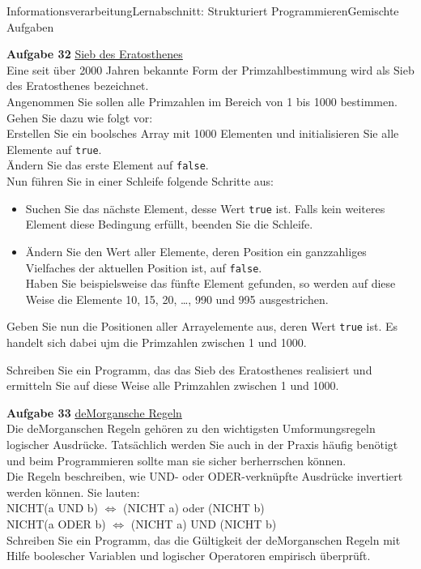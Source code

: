 \documentclass[oneside,openany,headings=optiontotoc,11pt,numbers=noenddot]{scrreprt}
\begin{document}
\begin{worksheet}{Informationsverarbeitung}{Lernabschnitt: Strukturiert Programmieren}{Gemischte Aufgaben}
\begin{framed}
			\par\noindent
			\textbf{Aufgabe 32} \underline{Sieb des Eratosthenes}\\
			Eine seit über 2000 Jahren bekannte Form der Primzahlbestimmung wird als \grqq{}Sieb des Eratosthenes\grqq{} bezeichnet.\\
			Angenommen Sie sollen alle Primzahlen im Bereich von 1 bis 1000 bestimmen. Gehen Sie dazu wie folgt vor:\\
			Erstellen Sie ein boolsches Array mit 1000 Elementen und initialisieren Sie alle Elemente auf \lstinline[style=JavaInputStyle]|true|.\\
			Ändern Sie das erste Element auf \lstinline[style=JavaInputStyle]|false|.\\
			Nun führen Sie in einer Schleife folgende Schritte aus:
			\begin{itemize}
				\item Suchen Sie das nächste Element, desse Wert \lstinline[style=JavaInputStyle]|true| ist. Falls kein weiteres Element diese Bedingung erfüllt, beenden Sie die Schleife.
				\item Ändern Sie den Wert aller Elemente, deren Position ein ganzzahliges Vielfaches der aktuellen Position ist, auf \lstinline[style=JavaInputStyle]|false|.\\
				Haben Sie beispielsweise das fünfte Element gefunden, so werden auf diese Weise die Elemente 10, 15, 20, \ldots , 990 und 995 ausgestrichen.
			\end{itemize}
			Geben Sie nun die Positionen aller Arrayelemente aus, deren Wert \lstinline[style=JavaInputStyle]|true| ist. Es handelt sich dabei ujm die Primzahlen zwischen 1 und 1000.\\
			\par\noindent
			Schreiben Sie ein Programm, das das \grqq{}Sieb des Eratosthenes\grqq{} realisiert und ermitteln Sie auf diese Weise alle Primzahlen zwischen 1 und 1000.\\
			\par\noindent
			\textbf{Aufgabe 33} \underline{deMorgan\grq{}sche Regeln}\\
			Die deMorgan\grqq{}schen Regeln gehören zu den wichtigsten Umformungsregeln logischer Ausdrücke. Tatsächlich werden Sie auch in der Praxis häufig benötigt und beim Programmieren sollte man sie sicher berherrschen können.\\
			Die Regeln beschreiben, wie UND- oder ODER-verknüpfte Ausdrücke invertiert werden können. Sie lauten:\\
			NICHT(a UND b) \(\Leftrightarrow\) (NICHT a) oder (NICHT b)\\
			NICHT(a ODER b) \(\Leftrightarrow\) (NICHT a) UND (NICHT b)\\
			Schreiben Sie ein Programm, das die Gültigkeit der deMorgan\grq{}schen Regeln mit Hilfe boolescher Variablen und logischer Operatoren empirisch überprüft.
		\end{framed}
	\end{worksheet}
\end{document}
